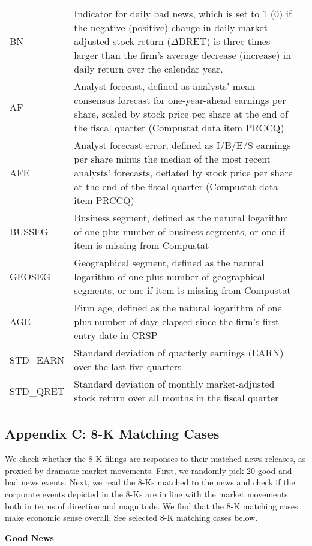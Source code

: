 \begin{table}[H]
\begin{tabular}{lp{15cm}p{15cm}}
		BN & Indicator for daily bad news, which is set to 1 (0) if the negative (positive) change in daily market-adjusted stock return ($\Delta$DRET) is three times larger than the firm’s average decrease (increase) in daily return over the calendar year.\\
		AF & Analyst forecast, defined as analysts' mean consensus forecast for one-year-ahead earnings per share, scaled by stock price per share at the end of the fiscal quarter (Compustat data item PRCCQ)\\
		AFE & Analyst forecast error, defined as I/B/E/S earnings per share minus the median of the most recent analysts' forecasts, deflated by stock price per share at the end of the fiscal quarter (Compustat data item PRCCQ)\\
		BUSSEG & Business segment, defined as the natural logarithm of one plus number of business segments, or one if item is missing from Compustat\\
		GEOSEG & Geographical segment, defined as the natural logarithm of one plus number of geographical segments, or one if item is missing from Compustat\\
		AGE & Firm age, defined as the natural logarithm of one plus number of days elapsed since the firm's first entry date in CRSP\\
		STD\_EARN & Standard deviation of quarterly earnings (EARN) over the last five quarters\\
		STD\_QRET & Standard deviation of monthly market-adjusted stock return over all months in the fiscal quarter\\
		\bottomrule
		\bottomrule
	\end{tabular}%
\end{table}%

\newpage
\subsection*{Appendix C: 8-K Matching Cases}
\label{appc}
We check whether the 8-K filings are responses to their matched news releases, as proxied by dramatic market movements. First, we randomly pick 20 good and bad news events. Next, we read the 8-Ks matched to the news and check if the corporate events depicted in the 8-Ks are in line with the market movements both in terms of direction and magnitude. We find that the 8-K matching cases make economic sense overall. See selected 8-K matching cases below.
\begin{center}
	\textbf{Good News}
\end{center}
